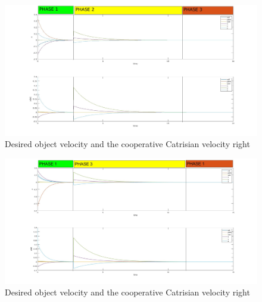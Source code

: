 \documentclass{article}
\begin{document}
\begin{figure}[h]
	\centering
	\includegraphics[width=1\textwidth]{imgs/ex3/desired object velocity and the cooperative Catrisian velocity right .jpg}
	\caption{\label{fig:1} Desired object velocity and the cooperative Catrisian velocity right}
\end{figure}
\begin{figure}[h]
	\centering
	\includegraphics[width=1\textwidth]{imgs/ex3/desired object velocity and the cooperative Catrisian velocity left .jpg}
	\caption{\label{fig:1} Desired object velocity and the cooperative Catrisian velocity right}
\end{figure}
\clearpage



		
\clearpage
\end{document}
